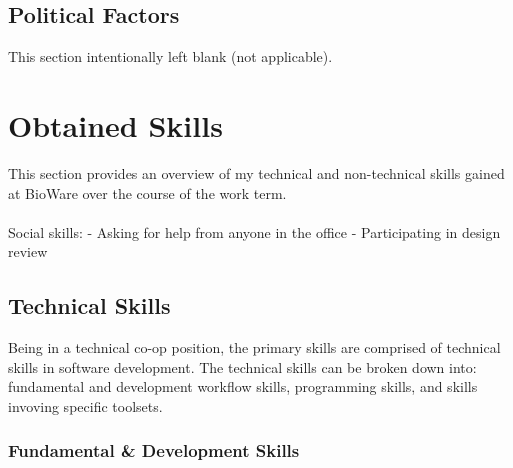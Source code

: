 \documentclass[10pt,letterpaper]{article}
\begin{document}
\subsection{Political Factors}


\begin{center}
	This section intentionally left blank (not applicable).
\end{center}


\clearpage
\section{Obtained Skills}\label{obtained-skills}

This section provides an overview of my technical and non-technical skills gained at BioWare over the course of the work term. \\
\\
Social skills:
- Asking for help from anyone in the office
- Participating in design review


\subsection{Technical Skills}

Being in a technical co-op position, the primary skills are comprised of technical skills in software development. The technical skills can be broken down into: fundamental and development workflow skills, programming skills, and skills invoving specific toolsets.\\

\subsubsection{Fundamental \& Development Skills}
\end{document}
